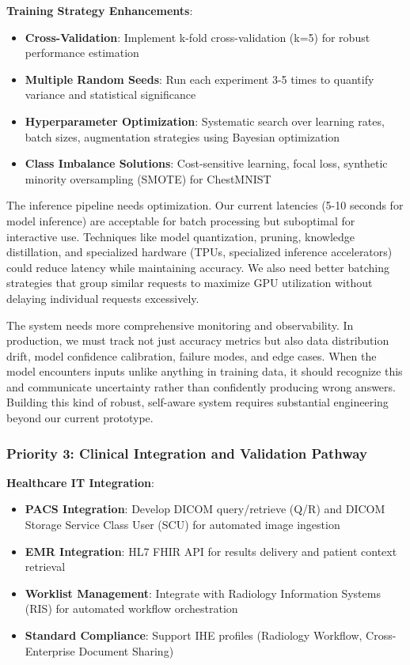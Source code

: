 \documentclass[12pt,a4paper]{article}
\begin{document}
\textbf{Training Strategy Enhancements}:
\begin{itemize}
    \item \textbf{Cross-Validation}: Implement k-fold cross-validation (k=5) for robust performance estimation
    \item \textbf{Multiple Random Seeds}: Run each experiment 3-5 times to quantify variance and statistical significance
    \item \textbf{Hyperparameter Optimization}: Systematic search over learning rates, batch sizes, augmentation strategies using Bayesian optimization
    \item \textbf{Class Imbalance Solutions}: Cost-sensitive learning, focal loss, synthetic minority oversampling (SMOTE) for ChestMNIST
\end{itemize}

The inference pipeline needs optimization. Our current latencies (5-10 seconds for model inference) are acceptable for batch processing but suboptimal for interactive use. Techniques like model quantization, pruning, knowledge distillation, and specialized hardware (TPUs, specialized inference accelerators) could reduce latency while maintaining accuracy. We also need better batching strategies that group similar requests to maximize GPU utilization without delaying individual requests excessively.

The system needs more comprehensive monitoring and observability. In production, we must track not just accuracy metrics but also data distribution drift, model confidence calibration, failure modes, and edge cases. When the model encounters inputs unlike anything in training data, it should recognize this and communicate uncertainty rather than confidently producing wrong answers. Building this kind of robust, self-aware system requires substantial engineering beyond our current prototype.

\subsubsection{Priority 3: Clinical Integration and Validation Pathway}

\textbf{Healthcare IT Integration}:
\begin{itemize}
    \item \textbf{PACS Integration}: Develop DICOM query/retrieve (Q/R) and DICOM Storage Service Class User (SCU) for automated image ingestion
    \item \textbf{EMR Integration}: HL7 FHIR API for results delivery and patient context retrieval
    \item \textbf{Worklist Management}: Integrate with Radiology Information Systems (RIS) for automated workflow orchestration
    \item \textbf{Standard Compliance}: Support IHE profiles (Radiology Workflow, Cross-Enterprise Document Sharing)
\end{itemize}
\end{document}
